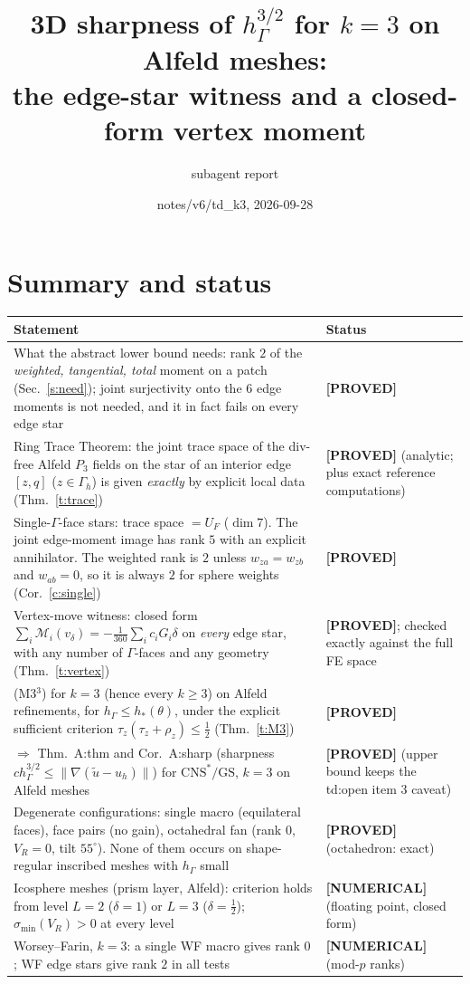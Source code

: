 \documentclass[11pt]{article}
\title{3D sharpness of $h_\Gamma^{3/2}$ for $k=3$ on Alfeld meshes:\\ \large the edge-star witness and a closed-form vertex moment}
\author{subagent report}
\date{notes/v6/td\_k3, 2026-09-28}
\theoremstyle{definition}
\newcommand{\hG}{h_\Gamma}
\newcommand{\Gh}{\Gamma_h}
\newcommand{\M}{\mathcal M}
\newcommand{\CNS}{\mathrm{CNS}^\ast}
\newcommand{\GS}{\mathrm{GS}}
\newcommand{\norm}[1]{\lVert #1\rVert}
\newcommand{\status}[1]{\textbf{[#1]}}
\begin{document}
\maketitle

\section*{Summary and status}
\begin{center}
\begin{tabular}{p{}p{}}
\toprule
Statement & Status\\
\midrule
What the abstract lower bound needs: rank $2$ of the \emph{weighted, tangential, total} moment on a patch (Sec.~\ref{s:need}); joint surjectivity onto the $6$ edge moments is not needed, and it in fact fails on every edge star & \status{PROVED}\\
Ring Trace Theorem: the joint trace space of the div-free Alfeld $P_3$ fields on the star of an interior edge $[z,q]$ ($z\in\Gh$) is given \emph{exactly} by explicit local data (Thm.~\ref{t:trace}) & \status{PROVED} (analytic; plus exact reference computations)\\
Single-$\Gamma$-face stars: trace space $=U_F$ ($\dim 7$). The joint edge-moment image has rank $5$ with an explicit annihilator. The weighted rank is $2$ unless $w_{za}=w_{zb}$ and $w_{ab}=0$, so it is always $2$ for sphere weights (Cor.~\ref{c:single}) & \status{PROVED}\\
Vertex-move witness: closed form $\sum_i\M_i(v_\delta)=-\frac1{360}\sum_ic_iG_i\delta$ on \emph{every} edge star, with any number of $\Gamma$-faces and any geometry (Thm.~\ref{t:vertex}) & \status{PROVED}; checked exactly against the full FE space\\
(M3$^3$) for $k=3$ (hence every $k\ge3$) on Alfeld refinements, for $\hG\le h_\ast(\theta)$, under the explicit sufficient criterion $\tau_z(\tau_z+\rho_z)\le\frac12$ (Thm.~\ref{t:M3}) & \status{PROVED}\\
$\Rightarrow$ Thm.~A:thm and Cor.~A:sharp (sharpness $c\hG^{3/2}\le\norm{\nabla(\tilde u-u_h)}$) for $\CNS/\GS$, $k=3$ on Alfeld meshes & \status{PROVED} (upper bound keeps the td:open item 3 caveat)\\
Degenerate configurations: single macro (equilateral faces), face pairs (no gain), octahedral fan (rank $0$, $V_R=0$, tilt $55^\circ$). None of them occurs on shape-regular inscribed meshes with $\hG$ small & \status{PROVED} (octahedron: exact)\\
Icosphere meshes (prism layer, Alfeld): criterion holds from level $L=2$ ($\delta=1$) or $L=3$ ($\delta=\frac12$); $\sigma_{\min}(V_R)>0$ at every level & \status{NUMERICAL} (floating point, closed form)\\
Worsey--Farin, $k=3$: a single WF macro gives rank $0$; WF edge stars give rank $2$ in all tests & \status{NUMERICAL} (mod-$p$ ranks)\\
\bottomrule
\end{tabular}
\end{center}
\end{document}
